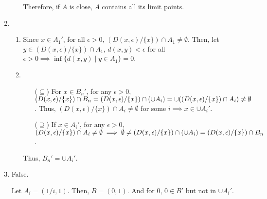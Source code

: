 \documentclass[12pt]{article}
\begin{document}
\begin{enumerate}
\begin{enumerate}
        Therefore, if $A$ is close, $A$ contains all its limit points.
    \end{enumerate}
    \newpage

    \item \begin{enumerate}
        \item Since $x \in A_1'$, for all $\epsilon > 0$, $(D(x, \epsilon)/\lbrace x \rbrace) \cap A_1 \neq \emptyset$.
        Then, let $y \in (D(x, \epsilon)/\lbrace x \rbrace) \cap A_1$, $d(x, y) < \epsilon$ for all $\epsilon > 0\implies \inf\lbrace d(x, y) \mid y \in A_1\rbrace = 0$.

        \item \begin{enumerate}
            \item[($\subseteq$)] For $x \in B_n'$, for any $\epsilon > 0$, $(D(x, \epsilon) / \lbrace x \rbrace) \cap B_n = (D(x, \epsilon) / \lbrace x \rbrace) \cap (\cup A_i) \\
            = \cup((D(x, \epsilon) / \lbrace x \rbrace) \cap A_i) \neq \emptyset$.
            Thus, $(D(x, \epsilon) / \lbrace x \rbrace) \cap A_i\neq \emptyset$ for some $i\implies x \in \cup A_i'$.
            
            \item[($\supseteq$)] If $x \in A_i'$, for any $\epsilon > 0$, $(D(x, \epsilon)/\lbrace x \rbrace) \cap A_i \neq \emptyset\implies \emptyset \neq (D(x, \epsilon) / \lbrace x \rbrace) \cap (\cup A_i) \\
            = (D(x, \epsilon) / \lbrace x \rbrace) \cap B_n$.
        \end{enumerate}

        Thus, $B_n' = \cup A_i'$.
    \end{enumerate}

    \item False.
    
    Let $A_i = (1/i, 1)$. Then, $B = (0, 1)$. And for $0$, $0 \in B'$ but not in $\cup A_i'$.
\end{enumerate}
\end{document}
